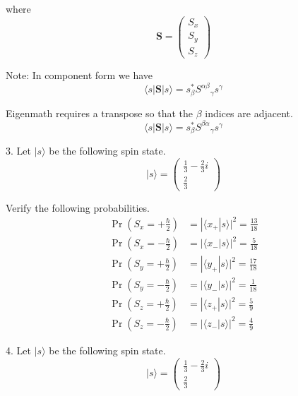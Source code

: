 where
\begin{equation*}
\mathbf S=\begin{pmatrix}S_x\\S_y\\S_z\end{pmatrix}
\end{equation*}

Note: In component form we have
\begin{equation*}
\langle s|\mathbf S|s\rangle
=s_\beta^*{S^{\alpha\beta}}_\gamma s^\gamma
\end{equation*}

Eigenmath requires a transpose so that the $\beta$ indices are adjacent.
\begin{equation*}
\langle s|\mathbf S|s\rangle
=s_\beta^*{S^{\beta\alpha}}_\gamma s^\gamma
\end{equation*}

3. Let $|s\rangle$ be the following spin state.
\begin{equation*}
|s\rangle=\begin{pmatrix}\frac{1}{3}-\frac{2}{3}i\\[1ex]\frac{2}{3}\end{pmatrix}
\end{equation*}

Verify the following probabilities.
\begin{align*}
\Pr\left(S_x=+\tfrac{\hbar}{2}\right)&=|\langle x_+|s\rangle|^2=\tfrac{13}{18}
\\
\Pr\left(S_x=-\tfrac{\hbar}{2}\right)&=|\langle x_-|s\rangle|^2=\tfrac{5}{18}
\\[1ex]
\Pr\left(S_y=+\tfrac{\hbar}{2}\right)&=|\langle y_+|s\rangle|^2=\tfrac{17}{18}
\\
\Pr\left(S_y=-\tfrac{\hbar}{2}\right)&=|\langle y_-|s\rangle|^2=\tfrac{1}{18}
\\[1ex]
\Pr\left(S_z=+\tfrac{\hbar}{2}\right)&=|\langle z_+|s\rangle|^2=\tfrac{5}{9}
\\
\Pr\left(S_z=-\tfrac{\hbar}{2}\right)&=|\langle z_-|s\rangle|^2=\tfrac{4}{9}
\end{align*}

4. Let $|s\rangle$ be the following spin state.
\begin{equation*}
|s\rangle=\begin{pmatrix}\frac{1}{3}-\frac{2}{3}i\\[1ex]\frac{2}{3}\end{pmatrix}
\end{equation*}

